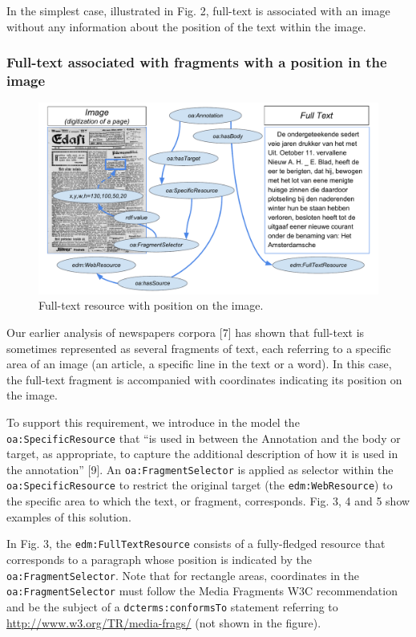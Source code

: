 \documentclass[a4paper,UKenglish,cleveref, autoref]{oasics-v2019}
\begin{document}
In the simplest case, illustrated in Fig. 2, full-text is associated with an image without any information about the position of the text within the image.

\subsubsection{Full-text associated with fragments with a position in the image}

\begin{figure}
    \centering
    \includegraphics{Fig3}
    \caption{Full-text resource with position on the image.}
\end{figure}

Our earlier analysis of newspapers corpora [7] has shown that full-text is sometimes represented as several fragments of text, each referring to a specific area of an image (an article, a specific line in the text or a word). In this case, the full-text fragment is accompanied with coordinates indicating its position on the image. 

To support this requirement, we introduce in the model the \verb+oa:SpecificResource+ that ``is used in between the Annotation and the body or target, as appropriate, to capture the additional description of how it is used in the annotation'' [9]. An \verb+oa:FragmentSelector+ is applied as selector within the \verb+oa:SpecificResource+ to restrict the original target (the \verb+edm:WebResource+) to the specific area to which the text, or fragment, corresponds. Fig. 3, 4 and 5 show examples of this solution.

In Fig. 3, the \verb+edm:FullTextResource+ consists of a fully-fledged resource that corresponds to a paragraph whose position is indicated by the \verb+oa:FragmentSelector+. Note that for rectangle areas, coordinates in the \verb+oa:FragmentSelector+ must follow the Media Fragments W3C recommendation and be the subject of a \verb+dcterms:conformsTo+ statement referring to \url{http://www.w3.org/TR/media-frags/} (not shown in the figure).
\end{document}

